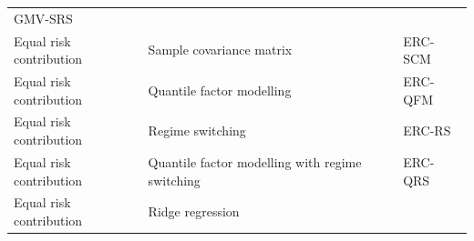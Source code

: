 \documentclass[
]{article}
\begin{document}
\begin{longtable}[]{@{}lll@{}}
\begin{minipage}[t]{0.15\columnwidth}
GMV-SRS\strut
\end{minipage}\tabularnewline
\begin{minipage}[t]{0.26\columnwidth}\raggedright
Equal risk contribution\strut
\end{minipage} & \begin{minipage}[t]{0.51\columnwidth}\raggedright
Sample covariance matrix\strut
\end{minipage} & \begin{minipage}[t]{0.15\columnwidth}\raggedright
ERC-SCM\strut
\end{minipage}\tabularnewline
\begin{minipage}[t]{0.26\columnwidth}\raggedright
Equal risk contribution\strut
\end{minipage} & \begin{minipage}[t]{0.51\columnwidth}\raggedright
Quantile factor modelling\strut
\end{minipage} & \begin{minipage}[t]{0.15\columnwidth}\raggedright
ERC-QFM\strut
\end{minipage}\tabularnewline
\begin{minipage}[t]{0.26\columnwidth}\raggedright
Equal risk contribution\strut
\end{minipage} & \begin{minipage}[t]{0.51\columnwidth}\raggedright
Regime switching\strut
\end{minipage} & \begin{minipage}[t]{0.15\columnwidth}\raggedright
ERC-RS\strut
\end{minipage}\tabularnewline
\begin{minipage}[t]{0.26\columnwidth}\raggedright
Equal risk contribution\strut
\end{minipage} & \begin{minipage}[t]{0.51\columnwidth}\raggedright
Quantile factor modelling with regime switching\strut
\end{minipage} & \begin{minipage}[t]{0.15\columnwidth}\raggedright
ERC-QRS\strut
\end{minipage}\tabularnewline
\begin{minipage}[t]{0.26\columnwidth}\raggedright
Equal risk contribution\strut
\end{minipage} & \begin{minipage}[t]{0.51\columnwidth}\raggedright
Ridge regression\strut
\end{minipage} & \begin{minipage}[t]{0.15\columnwidth}\raggedright

\end{minipage}
\end{longtable}
\end{document}
